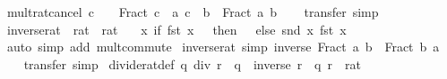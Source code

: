 \begin{isabellebody}
%
\isadelimproof
\isanewline
%
\endisadelimproof
\isanewline
{}\isamarkupfalse%
\ mult{\isacharunderscore}{\kern0pt}rat{\isacharunderscore}{\kern0pt}cancel{\isacharcolon}{\kern0pt}\ {\isachardoublequoteopen}c\ {\isasymnoteq}\ {}\ {\isasymLongrightarrow}\ Fract\ {\isacharparenleft}{\kern0pt}c\ {\isacharasterisk}{\kern0pt}\ a{\isacharparenright}{\kern0pt}\ {\isacharparenleft}{\kern0pt}c\ {\isacharasterisk}{\kern0pt}\ b{\isacharparenright}{\kern0pt}\ {\isacharequal}{\kern0pt}\ Fract\ a\ b{\isachardoublequoteclose}\isanewline
%
\isadelimproof
\ \ %
\endisadelimproof
%
\isatagproof
{}\isamarkupfalse%
\ transfer\ simp%
\endisatagproof
{\isafoldproof}%
%
\isadelimproof
\isanewline
%
\endisadelimproof
\isanewline
{}\isamarkupfalse%
\ inverse{\isacharunderscore}{\kern0pt}rat\ {\isacharcolon}{\kern0pt}{\isacharcolon}{\kern0pt}\ {\isachardoublequoteopen}rat\ {\isasymRightarrow}\ rat{\isachardoublequoteclose}\isanewline
\ \ \ {\isachardoublequoteopen}{\isasymlambda}x{\isachardot}{\kern0pt}\ if\ fst\ x\ {\isacharequal}{\kern0pt}\ {}\ then\ {\isacharparenleft}{\kern0pt}{}{\isacharcomma}{\kern0pt}\ {}{\isacharparenright}{\kern0pt}\ else\ {\isacharparenleft}{\kern0pt}snd\ x{\isacharcomma}{\kern0pt}\ fst\ x{\isacharparenright}{\kern0pt}{\isachardoublequoteclose}\isanewline
%
\isadelimproof
\ \ %
\endisadelimproof
%
\isatagproof
{}\isamarkupfalse%
\ {\isacharparenleft}{\kern0pt}auto\ simp\ add{\isacharcolon}{\kern0pt}\ mult{\isachardot}{\kern0pt}commute{\isacharparenright}{\kern0pt}%
\endisatagproof
{\isafoldproof}%
%
\isadelimproof
\isanewline
%
\endisadelimproof
\isanewline
{}\isamarkupfalse%
\ inverse{\isacharunderscore}{\kern0pt}rat\ {\isacharbrackleft}{\kern0pt}simp{\isacharbrackright}{\kern0pt}{\isacharcolon}{\kern0pt}\ {\isachardoublequoteopen}inverse\ {\isacharparenleft}{\kern0pt}Fract\ a\ b{\isacharparenright}{\kern0pt}\ {\isacharequal}{\kern0pt}\ Fract\ b\ a{\isachardoublequoteclose}\isanewline
%
\isadelimproof
\ \ %
\endisadelimproof
%
\isatagproof
{}\isamarkupfalse%
\ transfer\ simp%
\endisatagproof
{\isafoldproof}%
%
\isadelimproof
\isanewline
%
\endisadelimproof
\isanewline
{}\isamarkupfalse%
\ divide{\isacharunderscore}{\kern0pt}rat{\isacharunderscore}{\kern0pt}def{\isacharcolon}{\kern0pt}\ {\isachardoublequoteopen}q\ div\ r\ {\isacharequal}{\kern0pt}\ q\ {\isacharasterisk}{\kern0pt}\ inverse\ r{\isachardoublequoteclose}\ \ q\ r\ {\isacharcolon}{\kern0pt}{\isacharcolon}{\kern0pt}\ rat\isanewline

\end{isabellebody}
